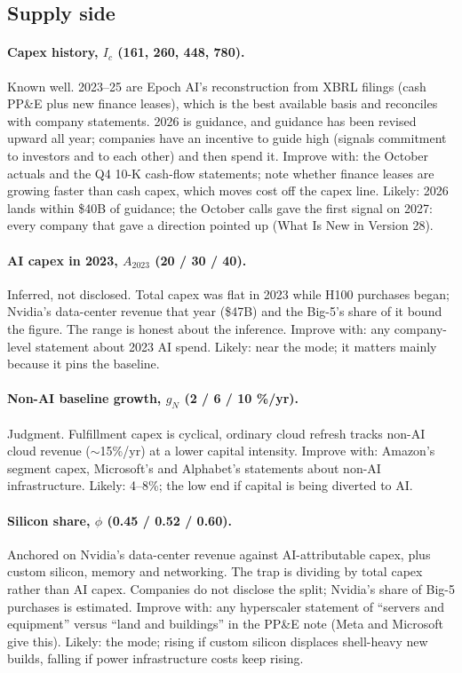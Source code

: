\documentclass[11pt,letterpaper]{article}
\begin{document}
\subsection*{Supply side}

\paragraph{Capex history, $I_c$ (161, 260, 448, 780).} Known well. 2023--25 are Epoch AI's reconstruction from XBRL filings (cash PP\&E plus new finance leases), which is the best available basis and reconciles with company statements. 2026 is guidance, and guidance has been revised upward all year; companies have an incentive to guide high (signals commitment to investors and to each other) and then spend it. Improve with: the October actuals and the Q4 10-K cash-flow statements; note whether finance leases are growing faster than cash capex, which moves cost off the capex line. Likely: 2026 lands within \$40B of guidance; the October calls gave the first signal on 2027: every company that gave a direction pointed up (What Is New in Version 28).

\paragraph{AI capex in 2023, $A_{2023}$ (20 / 30 / 40).} Inferred, not disclosed. Total capex was flat in 2023 while H100 purchases began; Nvidia's data-center revenue that year (\$47B) and the Big-5's share of it bound the figure. The range is honest about the inference. Improve with: any company-level statement about 2023 AI spend. Likely: near the mode; it matters mainly because it pins the baseline.

\paragraph{Non-AI baseline growth, $g_N$ (2 / 6 / 10 \%/yr).} Judgment. Fulfillment capex is cyclical, ordinary cloud refresh tracks non-AI cloud revenue ($\sim$15\%/yr) at a lower capital intensity. Improve with: Amazon's segment capex, Microsoft's and Alphabet's statements about non-AI infrastructure. Likely: 4--8\%; the low end if capital is being diverted to AI.

\paragraph{Silicon share, $\phi$ (0.45 / 0.52 / 0.60).} Anchored on Nvidia's data-center revenue against AI-attributable capex, plus custom silicon, memory and networking. The trap is dividing by total capex rather than AI capex. Companies do not disclose the split; Nvidia's share of Big-5 purchases is estimated. Improve with: any hyperscaler statement of ``servers and equipment'' versus ``land and buildings'' in the PP\&E note (Meta and Microsoft give this). Likely: the mode; rising if custom silicon displaces shell-heavy new builds, falling if power infrastructure costs keep rising.
\end{document}
